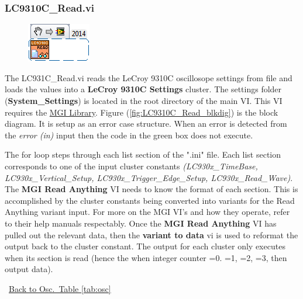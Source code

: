 \documentclass[11pt,a4paper,oldfontcommands]{memoir}
\begin{document}
\subsubsection{LC9310C\_Read.vi} \label{LC9310C_Read}
\noindent\hrulefill

\begin{figure}[h]
	\includegraphics[scale=0.625]{LC931C_Read_main}
	\label{fig:LC9310C_Read_main}
\end{figure}

The LC931C\_Read.vi reads the LeCroy 9310C oscillosope settings from file and loads the values into a \textbf{LeCroy 9310C Settings} cluster. The settings folder (\textbf{System\_Settings}) is located in the root directory of the main VI. This VI requires the \href{http://sine.ni.com/nips/cds/view/p/lang/en/nid/209753}{MGI Library}. Figure (\ref{fig:LC9310C_Read_blkdig}) is the block diagram.  It is setup as an error case structure. When an error is detected from the \textit{error (in)} input then the code in the green box does not execute.

The for loop steps through each list section of the ".ini" file. Each list section corresponds to one of the input cluster constants \textit{(LC930x\_TimeBase, LC930x\_Vertical\_Setup, LC930x\_Trigger\_Edge\_Setup, LC930x\_Read\_Wave)}. The \textbf{MGI Read Anything} VI needs to know the format of each section. This is accomplished by the cluster constants being converted into variants for the Read Anything variant input.  For more on the MGI VI's and how they operate, refer to their help manuals respectably. Once the \textbf{MGI Read Anything} VI has pulled out the relevant data, then the \textbf{variant to data} vi is used to reformat the output back to the cluster constant. The output for each cluster only executes when its section is read (hence the when integer counter =0. =1, =2, =3, then output data). 

\noindent\hrulefill\, \hyperref[tab:osc]{Back to Osc.\ Table \ref{tab:osc}}
\end{document}
